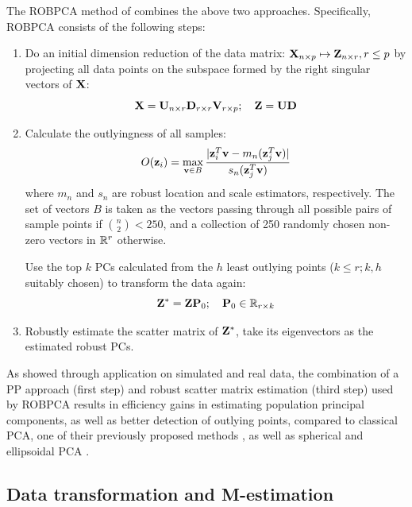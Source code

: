 The ROBPCA method of \cite{hubert05} combines the above two approaches. Specifically, ROBPCA consists of the following steps:
%
\begin{enumerate}
\item Do an initial dimension reduction of the data matrix: ${\mathbf{X}}_{n \times p} \mapsto {\mathbf{Z}}_{n \times r}, r \leq p$ by projecting all data points on the subspace formed by the right singular vectors of ${\mathbf{X}}$:
%
$$
{\mathbf{X}} = {\mathbf{U}}_{n \times r} {\mathbf{D}}_{r \times r} {\mathbf{V}}_{r \times p}; \quad
{\mathbf{Z}} = {\mathbf{U}} {\mathbf{D}}
$$

\item Calculate the outlyingness of all samples:
%
$$
O({\bf{z}}_i) = \max_{{\bf{v}} \in B} \frac{| {\bf{z}}_i^T {\bf{v}} - m_n ({\bf{z}}_j^T {\bf{v}})|}{s_n ({\bf{z}}_j^T {\bf{v}} )}
$$
%
where $m_n$ and $s_n$ are robust location and scale estimators, respectively. The set of vectors $B$ is taken as the vectors passing through all possible pairs of sample points if $\binom{n}{2} < 250$, and a collection of 250 randomly chosen non-zero vectors in ${\mathbb{R}}^{r}$ otherwise.

Use the top $k$ PCs calculated from the $h$ least outlying points ($k \leq r; k, h$ suitably chosen) to transform the data again:
%
$$
{\mathbf{Z}}^* =  {\mathbf{Z}} {\mathbf{P}}_0; \quad {\mathbf{P}}_0 \in {\mathbb{R}}_{r \times k}
$$


\item Robustly estimate the scatter matrix of ${\mathbf{Z}}^*$, take its eigenvectors as the estimated robust PCs.
\end{enumerate}

As \cite{hubert05} showed through application on simulated and real data, the combination of a PP approach (first step) and robust scatter matrix estimation (third step) used by ROBPCA results in efficiency gains in estimating population principal components, as well as better detection of outlying points, compared to classical PCA, one of their previously proposed methods \citep{HubertEtal02}, as well as spherical and ellipsoidal PCA \citep{LocantoreEtal99}.

\subsection*{\sffamily \large Data transformation and M-estimation}

